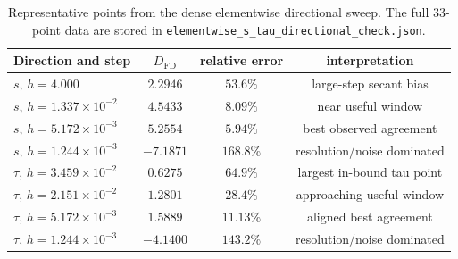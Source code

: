 \documentclass[11pt]{article}
\begin{document}
\begin{table}[h!]
\centering
\caption{Representative points from the dense elementwise directional sweep. The full 33-point data are stored in \texttt{elementwise\_s\_tau\_directional\_check.json}.}
\label{tab:elementwise_smooth_trend}
\begin{tabular}{@{}lccc@{}}
\toprule
Direction and step & \(D_{\mathrm{FD}}\) & relative error & interpretation \\
\midrule
\(s\), \(h=4.000\) & \(2.2946\) & \(53.6\%\) & large-step secant bias \\
\(s\), \(h=1.337\times10^{-2}\) & \(4.5433\) & \(8.09\%\) & near useful window \\
\(s\), \(h=5.172\times10^{-3}\) & \(5.2554\) & \(5.94\%\) & best observed agreement \\
\(s\), \(h=1.244\times10^{-3}\) & \(-7.1871\) & \(168.8\%\) & resolution/noise dominated \\
\(\tau\), \(h=3.459\times10^{-2}\) & \(0.6275\) & \(64.9\%\) & largest in-bound tau point \\
\(\tau\), \(h=2.151\times10^{-2}\) & \(1.2801\) & \(28.4\%\) & approaching useful window \\
\(\tau\), \(h=5.172\times10^{-3}\) & \(1.5889\) & \(11.13\%\) & aligned best agreement \\
\(\tau\), \(h=1.244\times10^{-3}\) & \(-4.1400\) & \(143.2\%\) & resolution/noise dominated \\
\bottomrule
\end{tabular}
\end{table}
\end{document}
